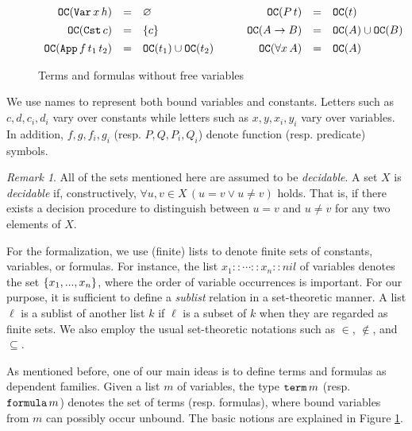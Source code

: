 \documentclass{kms-j}
\theoremstyle{plain}
\theoremstyle{remark}
\newtheorem{rem}[thm]{Remark}
\begin{document}
\begin{figure}[t]
\[
\begin{array}{rcl}
  \textup{\tt OC}(\textup{\tt Var}\, x\, h) & = & \varnothing\\[1ex]
  \textup{\tt OC}(\textup{\tt Cst}\, c) & = & \{ c \}\\[1ex]
  \textup{\tt OC}(\textup{\tt App}\, f\, t_1\, t_2) & = & \textup{\tt OC}(t_1) \cup \textup{\tt OC}(t_2)
\end{array} \qquad
\begin{array}{rcl}
  \textup{\tt OC}(P\, t) & = & \textup{\tt OC}(t)\\[1ex]
  \textup{\tt OC}(A \to B) & = & \textup{\tt OC}(A) \cup \textup{\tt OC}(B)\\[1ex]
  \textup{\tt OC}(\forall x\, A) & = & \textup{\tt OC}(A)
\end{array}
\]
%
\hrulefill
\caption{Terms and formulas without free variables}
  \label{fig:pseudo}
\end{figure}

We use names to represent both bound variables and constants.
Letters such as $c, d, c_i, d_i$ vary over constants while letters
such as $x, y, x_i, y_i$ vary over variables.
In addition, $f,g, f_i, g_i$ (resp. $P, Q, P_i, Q_i$) denote function (resp. predicate) symbols.

\begin{rem}
All of the sets mentioned here are assumed to be \textit{decidable}.
A set $X$ is {\em decidable} if, constructively, $\forall u, v \in X
\, (u=v \lor u\neq v)$ holds. That is, if there exists a decision procedure to distinguish between $u=v$ and $u \neq v$ for any two elements
of $X$.
\end{rem}

For the formalization, we use (finite) lists to denote finite sets of
constants, variables, or formulas. For instance, the list $x_1 :: \cdots :: x_n :: nil$ of variables denotes
the set $\{ x_1, ..., x_n \}$, where the order of variable occurrences is important.
For our purpose, it is sufficient to define a \textit{sublist}
relation in a set-theoretic manner. A list $\ell$ is a sublist of another list $k$ if $\ell$ is a subset of $k$
when they are regarded as finite sets.
We also employ the usual set-theoretic notations such as $\in$,
$\not\in$, and $\subseteq$.

As mentioned before,
one of our main ideas is to define  terms and  formulas as dependent families.
Given a list $m$ of variables, %
the type $\textup{\tt term}\, m$ (resp. $\textup{\tt formula}\, m$) denotes the set of  terms (resp.  formulas),
where bound variables from $m$ can possibly occur unbound.
The basic notions are explained in Figure \ref{fig:pseudo}.
\end{document}
